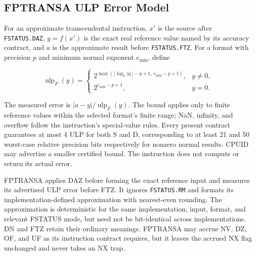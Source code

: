 \subsection{FPTRANSA ULP Error Model}
For an approximate transcendental instruction, $x'$ is the source after \texttt{FSTATUS.DAZ}, $y=f(x')$ is the
exact real reference value named by its accuracy contract, and $a$ is the approximate result before
\texttt{FSTATUS.FTZ}. For a format with precision $p$ and minimum normal exponent $e_{\min}$, define

\[
  \operatorname{ulp}_F(y) =
  \begin{cases}
    2^{\max(\lfloor\log_2 |y|\rfloor-p+1,\ e_{\min}-p+1)}, & y\ne0,\\
    2^{e_{\min}-p+1}, & y=0.
  \end{cases}
\]

The measured error is $|a-y|/\operatorname{ulp}_F(y)$. The bound applies only to finite reference values within
the selected format's finite range; NaN, infinity, and overflow follow the instruction's special-value rules.
Every present contract guarantees at most 4 ULP for both S and D, corresponding to at least 21 and 50 worst-case
relative precision bits respectively for nonzero normal results. CPUID may advertise a smaller certified bound.
The instruction does not compute or return its actual error.

FPTRANSA applies DAZ before forming the exact reference input and measures its advertised ULP error before FTZ.
It ignores \texttt{FSTATUS.RM} and formats its implementation-defined approximation with nearest-even rounding.
The approximation is deterministic for the same implementation, input, format, and relevant FSTATUS mode, but need
not be bit-identical across implementations. DN and FTZ retain their ordinary meanings. FPTRANSA may accrue NV, DZ,
OF, and UF as its instruction contract requires, but it leaves the accrued NX flag unchanged and never takes an NX
trap.
